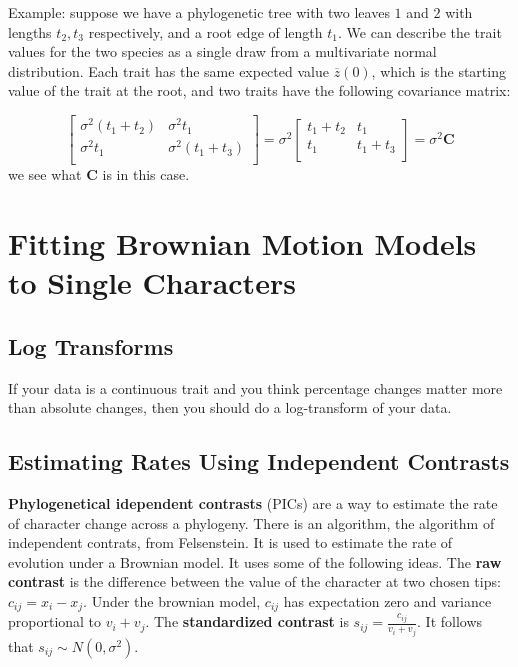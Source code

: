 \documentclass{article}
\newcommand{\1}[1]{\textbf{1}_{\left[#1\right]}} %
\begin{document}
Example: suppose we have a phylogenetic tree with two leaves $1$ and $2$ with
lengths $t_{2},t_{3}$ respectively, and a root edge of length $t_{1}$. We can
describe the trait values for the two species as a single draw from a
multivariate normal distribution. Each trait has the same expected value
$\overline{z}(0)$, which is the starting value of the trait at the root, and two
traits have the following covariance matrix:

\begin{equation*}
  \begin{bmatrix}
    \sigma^2 (t_1 + t_2) & \sigma^2 t_1 \\
    \sigma^2 t_1 & \sigma^2 (t_1 + t_3) \\
\end{bmatrix}
= \sigma^2
\begin{bmatrix}
    t_1 + t_2 & t_1 \\
    t_1 & t_1 + t_3 \\
\end{bmatrix} = \sigma^2 \mathbf{C}
\end{equation*}
we see what $\mathbf{C}$ is in this case.

\section{Fitting Brownian Motion Models to Single Characters}
\subsection{Log Transforms}
If your data is a continuous trait and you think percentage changes matter more
than absolute changes, then you should do a log-transform of your data.

\subsection{Estimating Rates Using Independent Contrasts}

\textbf{Phylogenetical idependent contrasts} (PICs) are a way to estimate the
rate of character change across a phylogeny. There is an algorithm, the
algorithm of independent contrats, from Felsenstein. It is used to estimate the
rate of evolution under a Brownian model. It uses some of the following ideas.
The \textbf{raw contrast} is the difference between the value of the character
at two chosen tips: $c_{ij} = x_{i}-x_{j}$. Under the brownian model, $c_{ij}$
has expectation zero and variance proportional to $v_{i}+v_{j}$. The
\textbf{standardized contrast} is $s_{ij} = \frac{c_{ij}}{v_{i}+v_{j}}$. It
follows that $s_{ij}\sim N(0,\sigma^{2})$.
\end{document}
